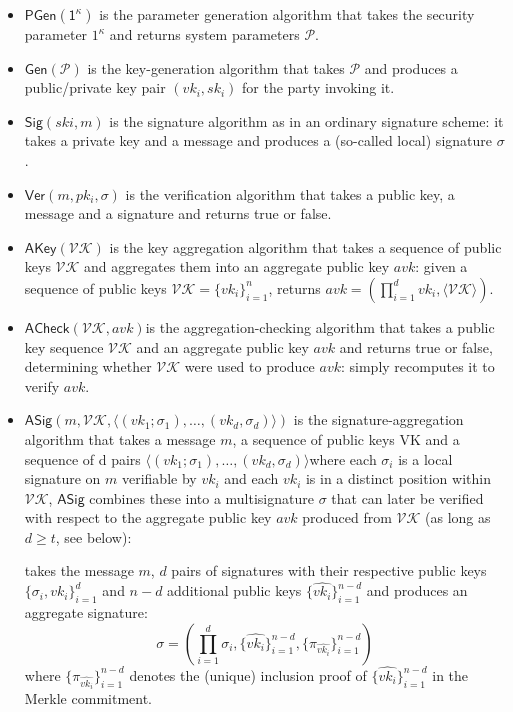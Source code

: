 \documentclass{article}
\begin{document}
\begin{itemize}
    \item $\mathsf{PGen(1^\kappa)}$ is the parameter generation algorithm that takes the security parameter $1^\kappa$ and returns system parameters $\mathcal{P}$.

    \item $\mathsf{Gen(\mathcal{P})}$ is the key-generation algorithm that takes $\mathcal{P}$ and produces a public/private key pair $(vk_i, sk_i)$ for the party invoking it.

    \item $\mathsf{Sig}(ski, m) $ is the signature algorithm as in an ordinary signature scheme: it takes a private key and a message and produces a (so-called local) signature $\sigma$.

    \item $\mathsf{Ver}(m, pk_i,\sigma)$ is the verification algorithm that takes a public key, a message and a signature and returns true or false.

    \item $\mathsf{AKey(\mathcal{VK})}$ is the key aggregation algorithm that takes a sequence of public keys $\mathcal{VK}$ and aggregates them into an aggregate public key $avk$: given a sequence of public keys $\mathcal{VK} = \{vk_i\}_{i=1}^n$, returns $avk = (\prod_{i=1}^d vk_i, \langle \mathcal{VK}\rangle)$.

    \item $\mathsf{ACheck}(\mathcal{VK},avk)$is the aggregation-checking algorithm that takes a public key sequence $\mathcal{VK}$ and an aggregate public key $avk$ and returns true or false, determining whether $\mathcal{VK}$ were used to produce $avk$: simply recomputes it to verify $avk$.

    \item $\mathsf{ASig} (m, \mathcal{VK},\langle(vk_1; \sigma_1), \ldots,(vk_d, \sigma_d)\rangle)$ is the signature-aggregation algorithm that takes a message $m$, a sequence of public keys VK and a sequence of d pairs $\langle(vk_1; \sigma_1), \ldots,(vk_d, \sigma_d)\rangle$where each $\sigma_i$ is a local
    signature on $m$ verifiable by $vk_i$ and each $vk_i$ is in a distinct position within $\mathcal{VK}$, $\mathsf{ASig}$ combines these into a multisignature $\sigma$ that can later be verified with respect to the aggregate public key $avk$ produced from $\mathcal{VK}$ (as long as $d \geq t$, see below): 

     takes the message $m$, $d$ pairs of signatures with their respective public keys $\{\sigma_i, vk_i\}_{i=1}^d$ and $n-d$ additional public keys $\{\widehat{vk_i}\}_{i=1}^{n-d}$ and produces an aggregate signature:
    \[
    \sigma = \left ( \prod_{i=1}^d \sigma_i , \{\widehat{vk_i}\}_{i=1}^{n-d}, \{\pi_{\widehat{vk_i}}\}_{i=1}^{n-d}\right )
    \]
    where $\{\pi_{\widehat{vk_i}}\}_{i=1}^{n-d}$ denotes the (unique) inclusion proof of $\{{\widehat{vk_i}}\}_{i=1}^{n-d}$ in the Merkle commitment.


\end{itemize}
\end{document}
